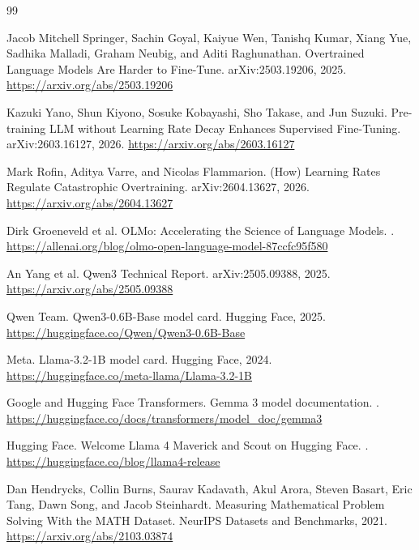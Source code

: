 \documentclass[11pt]{article}
\begin{document}
\begin{thebibliography}{99}

Jacob Mitchell Springer, Sachin Goyal, Kaiyue Wen, Tanishq Kumar, Xiang Yue, Sadhika Malladi, Graham Neubig, and Aditi Raghunathan.
\newblock Overtrained Language Models Are Harder to Fine-Tune.
\newblock arXiv:2503.19206, 2025.
\newblock \url{https://arxiv.org/abs/2503.19206}

Kazuki Yano, Shun Kiyono, Sosuke Kobayashi, Sho Takase, and Jun Suzuki.
\newblock Pre-training LLM without Learning Rate Decay Enhances Supervised Fine-Tuning.
\newblock arXiv:2603.16127, 2026.
\newblock \url{https://arxiv.org/abs/2603.16127}

Mark Rofin, Aditya Varre, and Nicolas Flammarion.
\newblock (How) Learning Rates Regulate Catastrophic Overtraining.
\newblock arXiv:2604.13627, 2026.
\newblock \url{https://arxiv.org/abs/2604.13627}

Dirk Groeneveld et al.
\newblock OLMo: Accelerating the Science of Language Models.
.
\newblock \url{https://allenai.org/blog/olmo-open-language-model-87ccfc95f580}

An Yang et al.
\newblock Qwen3 Technical Report.
\newblock arXiv:2505.09388, 2025.
\newblock \url{https://arxiv.org/abs/2505.09388}

Qwen Team.
\newblock Qwen3-0.6B-Base model card.
\newblock Hugging Face, 2025.
\newblock \url{https://huggingface.co/Qwen/Qwen3-0.6B-Base}

Meta.
\newblock Llama-3.2-1B model card.
\newblock Hugging Face, 2024.
\newblock \url{https://huggingface.co/meta-llama/Llama-3.2-1B}

Google and Hugging Face Transformers.
\newblock Gemma 3 model documentation.
.
\newblock \url{https://huggingface.co/docs/transformers/model_doc/gemma3}

Hugging Face.
\newblock Welcome Llama 4 Maverick and Scout on Hugging Face.
.
\newblock \url{https://huggingface.co/blog/llama4-release}

Dan Hendrycks, Collin Burns, Saurav Kadavath, Akul Arora, Steven Basart, Eric Tang, Dawn Song, and Jacob Steinhardt.
\newblock Measuring Mathematical Problem Solving With the MATH Dataset.
\newblock NeurIPS Datasets and Benchmarks, 2021.
\newblock \url{https://arxiv.org/abs/2103.03874}


\end{thebibliography}
\end{document}
